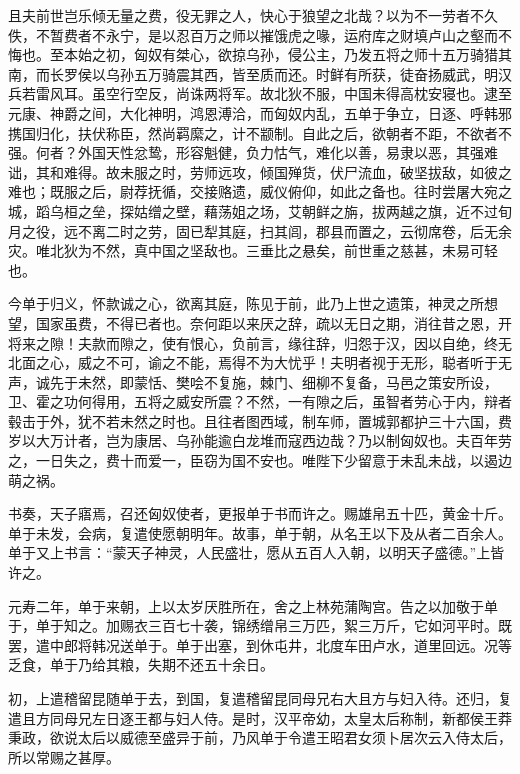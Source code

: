 \documentclass[]{article}
\begin{document}
且夫前世岂乐倾无量之费，役无罪之人，快心于狼望之北哉？以为不一劳者不久佚，不暂费者不永宁，是以忍百万之师以摧饿虎之喙，运府库之财填卢山之壑而不悔也。至本始之初，匈奴有桀心，欲掠乌孙，侵公主，乃发五将之师十五万骑猎其南，而长罗侯以乌孙五万骑震其西，皆至质而还。时鲜有所获，徒奋扬威武，明汉兵若雷风耳。虽空行空反，尚诛两将军。故北狄不服，中国未得高枕安寝也。逮至元康、神爵之间，大化神明，鸿恩溥洽，而匈奴内乱，五单于争立，日逐、呼韩邪携国归化，扶伏称臣，然尚羁縻之，计不颛制。自此之后，欲朝者不距，不欲者不强。何者？外国天性忿鸷，形容魁健，负力怙气，难化以善，易隶以恶，其强难诎，其和难得。故未服之时，劳师远攻，倾国殚货，伏尸流血，破坚拔敌，如彼之难也；既服之后，尉荐抚循，交接赂遗，威仪俯仰，如此之备也。往时尝屠大宛之城，蹈乌桓之垒，探姑缯之壁，藉荡姐之场，艾朝鲜之旃，拔两越之旗，近不过旬月之役，远不离二时之劳，固已犁其庭，扫其闾，郡县而置之，云彻席卷，后无余灾。唯北狄为不然，真中国之坚敌也。三垂比之悬矣，前世重之慈甚，未易可轻也。

今单于归义，怀款诚之心，欲离其庭，陈见于前，此乃上世之遗策，神灵之所想望，国家虽费，不得已者也。奈何距以来厌之辞，疏以无日之期，消往昔之恩，开将来之隙！夫款而隙之，使有恨心，负前言，缘往辞，归怨于汉，因以自绝，终无北面之心，威之不可，谕之不能，焉得不为大忧乎！夫明者视于无形，聪者听于无声，诚先于未然，即蒙恬、樊哙不复施，棘门、细柳不复备，马邑之策安所设，卫、霍之功何得用，五将之威安所震？不然，一有隙之后，虽智者劳心于内，辩者毂击于外，犹不若未然之时也。且往者图西域，制车师，置城郭都护三十六国，费岁以大万计者，岂为康居、乌孙能逾白龙堆而寇西边哉？乃以制匈奴也。夫百年劳之，一日失之，费十而爱一，臣窃为国不安也。唯陛下少留意于未乱未战，以遏边萌之祸。

书奏，天子寤焉，召还匈奴使者，更报单于书而许之。赐雄帛五十匹，黄金十斤。单于未发，会病，复遣使愿朝明年。故事，单于朝，从名王以下及从者二百余人。单于又上书言：``蒙天子神灵，人民盛壮，愿从五百人入朝，以明天子盛德。''上皆许之。

元寿二年，单于来朝，上以太岁厌胜所在，舍之上林苑蒲陶宫。告之以加敬于单于，单于知之。加赐衣三百七十袭，锦绣缯帛三万匹，絮三万斤，它如河平时。既罢，遣中郎将韩况送单于。单于出塞，到休屯井，北度车田卢水，道里回远。况等乏食，单于乃给其粮，失期不还五十余日。

初，上遣稽留昆随单于去，到国，复遣稽留昆同母兄右大且方与妇入待。还归，复遣且方同母兄左日逐王都与妇人侍。是时，汉平帝幼，太皇太后称制，新都侯王莽秉政，欲说太后以威德至盛异于前，乃风单于令遣王昭君女须卜居次云入侍太后，所以常赐之甚厚。
\end{document}
